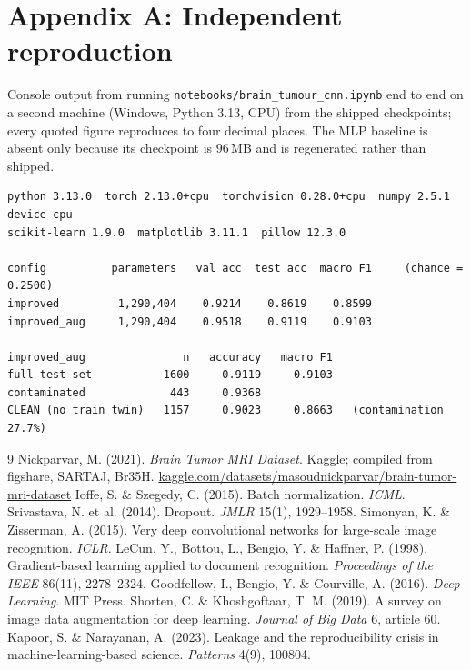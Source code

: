 \documentclass[10pt,a4paper]{article}
\begin{document}

\enlargethispage{5\baselineskip}
\section*{Appendix A: Independent reproduction}

Console output from running \texttt{notebooks/brain\_tumour\_cnn.ipynb} end to
end on a second machine (Windows, Python 3.13, CPU) from the shipped
checkpoints; every quoted figure reproduces to four decimal places. The MLP
baseline is absent only because its checkpoint is $96$\,MB and is regenerated
rather than shipped.

\scriptsize
\begin{verbatim}
python 3.13.0  torch 2.13.0+cpu  torchvision 0.28.0+cpu  numpy 2.5.1  device cpu
scikit-learn 1.9.0  matplotlib 3.11.1  pillow 12.3.0

config          parameters   val acc  test acc  macro F1     (chance = 0.2500)
improved         1,290,404    0.9214    0.8619    0.8599
improved_aug     1,290,404    0.9518    0.9119    0.9103

improved_aug               n   accuracy   macro F1
full test set           1600     0.9119     0.9103
contaminated             443     0.9368
CLEAN (no train twin)   1157     0.9023     0.8663   (contamination 27.7%)
\end{verbatim}
\normalsize


\begin{thebibliography}{9}
\footnotesize\setlength{\itemsep}{0pt}\setlength{\parskip}{0pt}
 Nickparvar, M. (2021). \emph{Brain Tumor MRI Dataset}. Kaggle;
compiled from figshare, SARTAJ, Br35H.
\url{kaggle.com/datasets/masoudnickparvar/brain-tumor-mri-dataset}
 Ioffe, S. \& Szegedy, C. (2015). Batch normalization. \emph{ICML}.
 Srivastava, N. et al. (2014). Dropout. \emph{JMLR} 15(1), 1929--1958.
 Simonyan, K. \& Zisserman, A. (2015). Very deep convolutional
networks for large-scale image recognition. \emph{ICLR}.
 LeCun, Y., Bottou, L., Bengio, Y. \& Haffner, P. (1998).
Gradient-based learning applied to document recognition. \emph{Proceedings of
the IEEE} 86(11), 2278--2324.
 Goodfellow, I., Bengio, Y. \& Courville, A. (2016).
\emph{Deep Learning}. MIT Press.
 Shorten, C. \& Khoshgoftaar, T. M. (2019). A survey on image
data augmentation for deep learning. \emph{Journal of Big Data} 6, article 60.
 Kapoor, S. \& Narayanan, A. (2023). Leakage and the
reproducibility crisis in machine-learning-based science. \emph{Patterns} 4(9),
100804.
\end{thebibliography}
\end{document}
